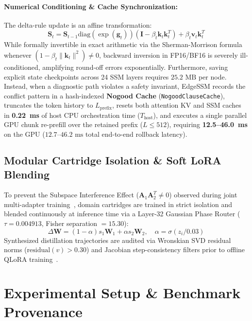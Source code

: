 \documentclass[journal]{IEEEtran}
\begin{document}
\paragraph{Numerical Conditioning \& Cache Synchronization:}
The delta-rule update is an affine transformation:
\begin{equation}
\mathbf{S}_t = \mathbf{S}_{t-1} \mathrm{diag}(\exp(\mathbf{g}_t)) (\mathbf{I} - \beta_t \mathbf{k}_t \mathbf{k}_t^T) + \beta_t \mathbf{v}_t \mathbf{k}_t^T
\end{equation}
While formally invertible in exact arithmetic via the Sherman-Morrison formula whenever $(1 - \beta_t \|\mathbf{k}_t\|^2) \neq 0$, backward inversion in FP16/BF16 is severely ill-conditioned, amplifying round-off errors exponentially. Furthermore, saving explicit state checkpoints across 24 SSM layers requires $25.2\text{ MB}$ per node. Instead, when a diagnostic path violates a safety invariant, EdgeSSM records the conflict pattern in a hash-indexed \textbf{Nogood Cache} (\texttt{NogoodClauseCache}), truncates the token history to $L_{\text{prefix}}$, resets both attention KV and SSM caches in \textbf{0.22~ms} of host CPU orchestration time ($T_{\text{host}}$), and executes a single parallel GPU chunk re-prefill over the retained prefix ($L \le 512$), requiring \textbf{12.5--46.0~ms} on the GPU ($12.7\text{--}46.2\text{ ms}$ total end-to-end rollback latency).

\subsection{Modular Cartridge Isolation \& Soft LoRA Blending}
To prevent the Subspace Interference Effect ($\mathbf{A}_1 \mathbf{A}_2^T \neq 0$) observed during joint multi-adapter training~\cite{ozturk2026sodals}, domain cartridges are trained in strict isolation and blended continuously at inference time via a Layer-32 Gaussian Phase Router ($\tau = 0.004913$, Fisher separation $= 15.30$):
\begin{equation}
\Delta \mathbf{W} = (1 - \alpha) s_1 \mathbf{W}_1 + \alpha s_2 \mathbf{W}_2, \quad \alpha = \sigma(z_i / 0.03)
\end{equation}
Synthesized distillation trajectories are audited via Wronskian SVD residual norms ($\text{residual}(v) > 0.30$) and Jacobian step-consistency filters prior to offline QLoRA training~\cite{dettmers2023qlora,frantar2022gptq}.

\section{Experimental Setup \& Benchmark Provenance}
\end{document}
